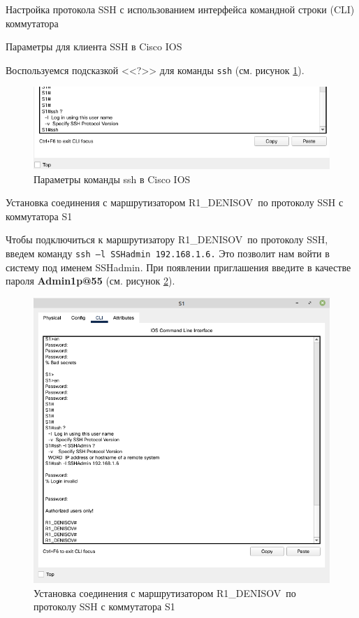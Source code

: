 \documentclass[a4paper,14pt]{extarticle}
\newcommand{\router}{R1\_DENISOV~}
\newcommand{\switch}{S1~}
\begin{document}
\begin{mypart}{Настройка протокола SSH с использованием интерфейса
		командной строки (CLI) коммутатора}
	
	\begin{step}{Параметры для клиента SSH в Cisco IOS}
		
		Воспользуемся подсказкой <<?>> для команды \texttt{ssh} (см. рисунок \ref{fig:pr8-ssh-params}). 
		\begin{figure}[h!]
			\centering
			\includegraphics[width=0.5\linewidth]{images/pr8-ssh-params}
			\caption{Параметры команды ssh в Cisco IOS}
			\label{fig:pr8-ssh-params}
		\end{figure}
		
	\end{step}

\begin{step}{Установка соединения с маршрутизатором \router по
		протоколу SSH с коммутатора \switch}

Чтобы подключиться к маршрутизатору \router по протоколу SSH, введем команду \texttt{ssh –l SSHadmin 192.168.1.6.} Это позволит нам войти в систему под именем SSHadmin. При появлении
приглашения введите в качестве пароля \textbf{Admin1p@55} (см. рисунок \ref{fig:switch-ssh-router}).



\begin{figure}[h!]
	\centering
	\includegraphics[width=0.6\linewidth]{images/switch-ssh-router}
	\caption{Установка соединения с маршрутизатором \router по
		протоколу SSH с коммутатора \switch}
	\label{fig:switch-ssh-router}
\end{figure}

\end{step}
\end{mypart}
\end{document}
